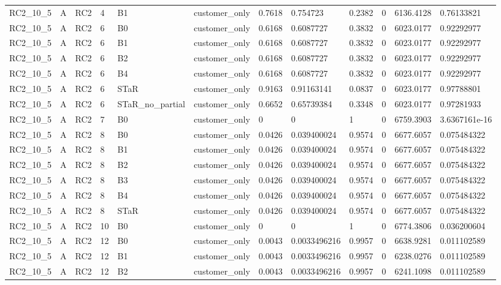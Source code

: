\begin{longtable}{llllllllllll}
RC2\_10\_5 & A & RC2 & 4 & B1 & customer\_only & 0.7618 & 0.754723 & 0.2382 & 0 & 6136.4128 & 0.76133821 \\
RC2\_10\_5 & A & RC2 & 6 & B0 & customer\_only & 0.6168 & 0.6087727 & 0.3832 & 0 & 6023.0177 & 0.92292977 \\
RC2\_10\_5 & A & RC2 & 6 & B1 & customer\_only & 0.6168 & 0.6087727 & 0.3832 & 0 & 6023.0177 & 0.92292977 \\
RC2\_10\_5 & A & RC2 & 6 & B2 & customer\_only & 0.6168 & 0.6087727 & 0.3832 & 0 & 6023.0177 & 0.92292977 \\
RC2\_10\_5 & A & RC2 & 6 & B4 & customer\_only & 0.6168 & 0.6087727 & 0.3832 & 0 & 6023.0177 & 0.92292977 \\
RC2\_10\_5 & A & RC2 & 6 & STaR & customer\_only & 0.9163 & 0.91163141 & 0.0837 & 0 & 6023.0177 & 0.97788801 \\
RC2\_10\_5 & A & RC2 & 6 & STaR\_no\_partial & customer\_only & 0.6652 & 0.65739384 & 0.3348 & 0 & 6023.0177 & 0.97281933 \\
RC2\_10\_5 & A & RC2 & 7 & B0 & customer\_only & 0 & 0 & 1 & 0 & 6759.3903 & 3.6367161e-16 \\
RC2\_10\_5 & A & RC2 & 8 & B0 & customer\_only & 0.0426 & 0.039400024 & 0.9574 & 0 & 6677.6057 & 0.075484322 \\
RC2\_10\_5 & A & RC2 & 8 & B1 & customer\_only & 0.0426 & 0.039400024 & 0.9574 & 0 & 6677.6057 & 0.075484322 \\
RC2\_10\_5 & A & RC2 & 8 & B2 & customer\_only & 0.0426 & 0.039400024 & 0.9574 & 0 & 6677.6057 & 0.075484322 \\
RC2\_10\_5 & A & RC2 & 8 & B3 & customer\_only & 0.0426 & 0.039400024 & 0.9574 & 0 & 6677.6057 & 0.075484322 \\
RC2\_10\_5 & A & RC2 & 8 & B4 & customer\_only & 0.0426 & 0.039400024 & 0.9574 & 0 & 6677.6057 & 0.075484322 \\
RC2\_10\_5 & A & RC2 & 8 & STaR & customer\_only & 0.0426 & 0.039400024 & 0.9574 & 0 & 6677.6057 & 0.075484322 \\
RC2\_10\_5 & A & RC2 & 10 & B0 & customer\_only & 0 & 0 & 1 & 0 & 6774.3806 & 0.036200604 \\
RC2\_10\_5 & A & RC2 & 12 & B0 & customer\_only & 0.0043 & 0.0033496216 & 0.9957 & 0 & 6638.9281 & 0.011102589 \\
RC2\_10\_5 & A & RC2 & 12 & B1 & customer\_only & 0.0043 & 0.0033496216 & 0.9957 & 0 & 6238.0276 & 0.011102589 \\
RC2\_10\_5 & A & RC2 & 12 & B2 & customer\_only & 0.0043 & 0.0033496216 & 0.9957 & 0 & 6241.1098 & 0.011102589 \\

\end{longtable}
